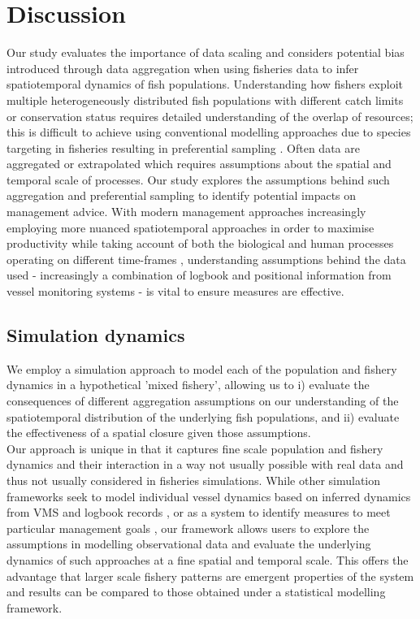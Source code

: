 \documentclass[review]{elsarticle}
\begin{document}
\section{Discussion}

Our study evaluates the importance of data scaling and considers potential bias
introduced through data aggregation when using fisheries data to infer
spatiotemporal dynamics of fish populations. Understanding how fishers exploit
multiple heterogeneously distributed fish populations with different catch
limits or conservation status requires detailed understanding of the overlap of
resources; this is difficult to achieve using conventional modelling approaches
due to species targeting in fisheries resulting in preferential sampling
\citep{Martinez-Minaya2018}. Often data are aggregated or extrapolated which
requires assumptions about the spatial and temporal scale of processes. Our
study explores the assumptions behind such aggregation and preferential
sampling to identify potential impacts on management advice. With modern
management approaches increasingly employing more nuanced spatiotemporal
approaches in order to maximise productivity while taking account of both the
biological and human processes operating on different time-frames
\citep{Dunn2016}, understanding assumptions behind the data used - increasingly
a combination of logbook and positional information from vessel monitoring
systems - is vital to ensure measures are effective. \\

\subsection{Simulation dynamics}
 
We employ a simulation approach to model each of the population and fishery
dynamics in a hypothetical 'mixed fishery', allowing us to i) evaluate the
consequences of different aggregation assumptions on our understanding of the
spatiotemporal distribution of the underlying fish populations, and ii)
evaluate the effectiveness of a spatial closure given those assumptions. \\

Our approach is unique in that it captures fine scale population and fishery
dynamics and their interaction in a way not usually possible with real data and
thus not usually considered in fisheries simulations. While other simulation
frameworks seek to model individual vessel dynamics based on inferred dynamics
from VMS and logbook records \citep{Bastardie2010}, or as a system to identify
measures to meet particular management goals \citep{Bailey2018}, our framework
allows users to explore the assumptions in modelling observational data and
evaluate the underlying dynamics of such approaches at a fine spatial and
temporal scale.  This offers the advantage that larger scale fishery patterns
are emergent properties of the system and results can be compared to those
obtained under a statistical modelling framework. \\
\end{document}
